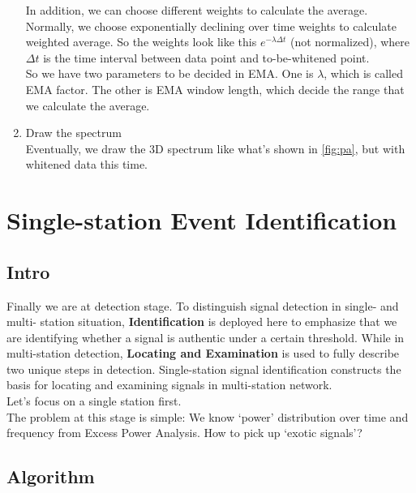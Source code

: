 \documentclass[
12pt, %
a4paper %
]{extreport}
\theoremstyle{plain}
\begin{document}
\begin{enumerate}
In addition, we can choose different weights to calculate the average. Normally, we choose exponentially declining over time weights to calculate weighted average. So the weights look like this $e^{-\lambda \Delta t}$ (not normalized), where $\Delta t$ is the time interval between data point and to-be-whitened point. \\
So we have two parameters to be decided in EMA. One is $\lambda$, which is called EMA factor. The other is EMA window length, which decide the range that we calculate the average. 
\item Draw the spectrum\\
Eventually, we draw the 3D spectrum like what's shown in \ref{fig:pa}, but with whitened data this time. 
\end{enumerate}
\chapter{Single-station Event Identification}
\section{Intro}
Finally we are at detection stage. To distinguish signal detection in single- and multi- station situation, \textbf{Identification} is deployed here to emphasize that we are identifying whether a signal is authentic under a certain threshold. While in multi-station detection, \textbf{Locating and Examination} is used to fully describe two unique steps in detection. Single-station signal identification constructs the basis for locating and examining signals in multi-station network.\\
Let’s focus on a single station first.\\
The problem at this stage is simple: We know `power’ distribution over time and frequency from Excess Power Analysis. How to pick up `exotic signals'?\\ %
\section{Algorithm}
\end{document}
